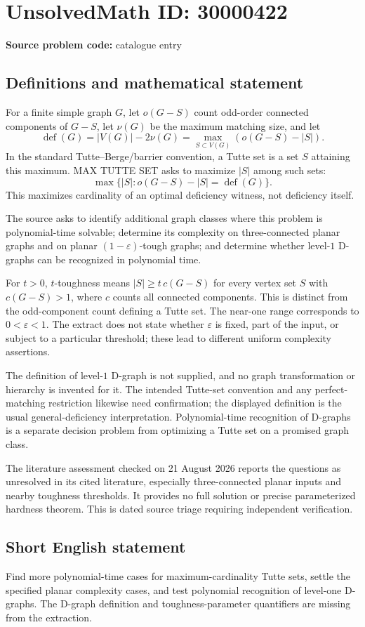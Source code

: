 \documentclass[11pt]{article}
\begin{document}
\section*{UnsolvedMath ID: 30000422}
\textbf{Source problem code:} catalogue entry
\subsection{Definitions and mathematical statement}
For a finite simple graph $G$, let $o(G-S)$ count odd-order connected components of $G-S$, let $\nu(G)$ be the maximum matching size, and let
\[
 \operatorname{def}(G)=|V(G)|-2\nu(G)
                     =\max_{S\subset V(G)}(o(G-S)-|S|).
\]
In the standard Tutte--Berge/barrier convention, a Tutte set is a set $S$ attaining this maximum. MAX TUTTE SET asks to maximize $|S|$ among such sets:
\[
 \max\{|S|:o(G-S)-|S|=\operatorname{def}(G)\}.
\]
This maximizes cardinality of an optimal deficiency witness, not deficiency itself.

The source asks to identify additional graph classes where this problem is polynomial-time solvable; determine its complexity on three-connected planar graphs and on planar $(1-\varepsilon)$-tough graphs; and determine whether level-$1$ D-graphs can be recognized in polynomial time.

For $t>0$, $t$-toughness means $|S|\ge t\,c(G-S)$ for every vertex set $S$ with $c(G-S)>1$, where $c$ counts all connected components. This is distinct from the odd-component count defining a Tutte set. The near-one range corresponds to $0<\varepsilon<1$. The extract does not state whether $\varepsilon$ is fixed, part of the input, or subject to a particular threshold; these lead to different uniform complexity assertions.

The definition of level-$1$ D-graph is not supplied, and no graph transformation or hierarchy is invented for it. The intended Tutte-set convention and any perfect-matching restriction likewise need confirmation; the displayed definition is the usual general-deficiency interpretation. Polynomial-time recognition of D-graphs is a separate decision problem from optimizing a Tutte set on a promised graph class.

The literature assessment checked on 21 August 2026 reports the questions as unresolved in its cited literature, especially three-connected planar inputs and nearby toughness thresholds. It provides no full solution or precise parameterized hardness theorem. This is dated source triage requiring independent verification.
\subsection{Short English statement}
Find more polynomial-time cases for maximum-cardinality Tutte sets, settle the specified planar complexity cases, and test polynomial recognition of level-one D-graphs. The D-graph definition and toughness-parameter quantifiers are missing from the extraction.
\end{document}
